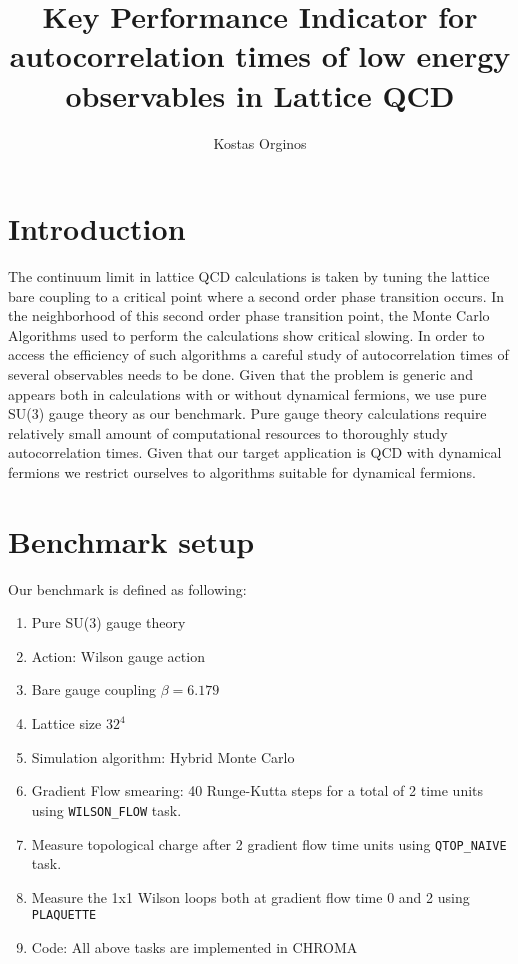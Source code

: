 \documentclass[11pt,a4paper]{article}
\title{Key Performance Indicator for autocorrelation times of low energy observables in Lattice QCD}
\author[a,b]{Kostas Orginos}
\affiliation[a]{Physics Department, College of William and Mary,
Williamsburg, Virginia 23187, U.S.A.}
\affiliation[b]{Thomas Jefferson National Accelerator Facility, Newport News, 
Virginia 23606, U.S.A.}
\begin{document}
\maketitle

\section{Introduction}

The continuum limit in lattice QCD calculations is taken by tuning the lattice bare coupling to a  critical point where a second order phase transition occurs. In the neighborhood of this second order phase transition point, the Monte Carlo Algorithms used to perform the calculations show critical slowing. In order to access the efficiency of such algorithms a careful study of autocorrelation times of several observables needs to be done.
Given that the problem is generic and appears both in calculations with or without dynamical fermions,  we use pure SU(3) gauge theory as our benchmark. Pure gauge theory calculations require relatively small amount of computational resources to thoroughly study autocorrelation times. Given that our target application is QCD with dynamical fermions we restrict ourselves to algorithms suitable for dynamical fermions.
 
\section{Benchmark setup}

Our benchmark is defined as following:
\begin{enumerate}
\item Pure SU(3) gauge theory
\item Action: Wilson gauge action
\item Bare gauge coupling $\beta=6.179$
\item Lattice size $32^4$
\item Simulation algorithm: Hybrid Monte Carlo 
\item Gradient Flow smearing: 40 Runge-Kutta steps for a total of 2 time units using {\tt WILSON\_FLOW} task. 
\item Measure topological charge after 2 gradient flow time units using {\tt QTOP\_NAIVE} task.
\item Measure the 1x1 Wilson loops both at gradient flow time 0 and 2 using {\tt PLAQUETTE}
\item Code: All above tasks are implemented in CHROMA~\cite{Edwards:2004sx}
\end{enumerate}
\end{document}
